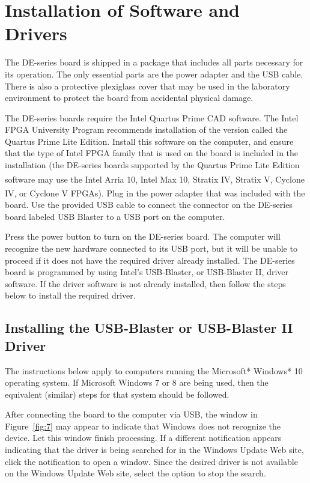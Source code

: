 \documentclass[11pt, twoside, pdftex]{article}
\begin{document}
\section{Installation of Software and Drivers}
The DE-series board is shipped in a package that includes all parts necessary for its
operation. The only essential parts are the power adapter and the USB cable.
There is also a protective plexiglass cover that may be used in the laboratory
environment to protect the board from accidental physical damage.

The DE-series boards require the Intel Quartus Prime CAD software. The Intel FPGA University
Program recommends installation of the version called the Quartus Prime Lite Edition. 
Install this software on the computer, and ensure that the type of Intel FPGA family 
that is used on the board is
included in the installation (the DE-series boards supported by the Quartus Prime Lite Edition
software may use the Intel Arria\textsuperscript{\textregistered} 10, Intel Max\textsuperscript{\textregistered} 10, Stratix\textsuperscript{\textregistered} IV, Stratix\textsuperscript{\textregistered} V, Cyclone\textsuperscript{\textregistered} IV, or Cyclone\textsuperscript{\textregistered} V FPGAs).
Plug in the power adapter that was included with the board. 
Use the provided USB cable to connect the connector on the DE-series board labeled
{\sf USB Blaster} to a USB port on the computer.  

Press the power button to turn on the DE-series board.
The computer will recognize the new hardware connected to its USB port, but
it will be unable to proceed if it does not have the required driver already
installed. The DE-series board is programmed by using Intel's USB-Blaster, or USB-Blaster
II, driver software.  If the driver software is not already installed, then 
follow the steps below to install the required driver.

\subsection{Installing the USB-Blaster or USB-Blaster II Driver}
\label{sec:windows_10}

The instructions below apply to computers running the Microsoft* Windows* 10 operating system. If
Microsoft Windows 7 or 8 are being used, then the equivalent (similar) steps for that system should be
followed.  

After connecting the board to the computer via USB, the window in 
Figure~\ref{fig:7} may appear to indicate that Windows does not recognize the device.  Let this window finish processing.
If a different notification appears indicating that the driver is being searched for in the 
Windows Update Web site, click the notification to open a window. Since the desired 
driver is not available on the Windows Update Web site, select the option to stop the search.
\end{document}
